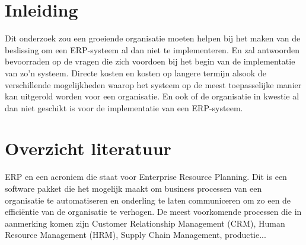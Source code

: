 \documentclass{hogent-article}
\affiliation{
  \textsuperscript{1} \href{mailto:sebastiaan.cuypers@student.hogent.be}{sebastiaan.cuypers@student.hogent.be}
}
\begin{document}
\flushbottom %
\maketitle %
\tableofcontents %
\thispagestyle{empty} %



\section{Inleiding}


Dit onderzoek zou een groeiende organisatie moeten helpen bij het maken van de beslissing om een ERP-systeem al dan niet te implementeren. En zal antwoorden bevoorraden op de vragen die zich voordoen bij het begin van de implementatie van zo'n systeem. Directe kosten en kosten op langere termijn alsook de verschillende mogelijkheden waarop het systeem op de meest toepasselijke manier kan uitgerold worden voor een organisatie. En ook of de organisatie in kwestie al dan niet geschikt is voor de implementatie van een ERP-systeem.

\section{Overzicht literatuur}



ERP en een acroniem die staat voor Enterprise Resource Planning. Dit is een software pakket die het mogelijk maakt om business processen van een organisatie te automatiseren en onderling te laten communiceren om zo een de efficiëntie van de organisatie te verhogen. De meest voorkomende processen die in aanmerking komen zijn Customer Relationship Management (CRM), Human Resource Management (HRM), Supply Chain Management, productie... \autocite{Microsoft2022}
\end{document}
